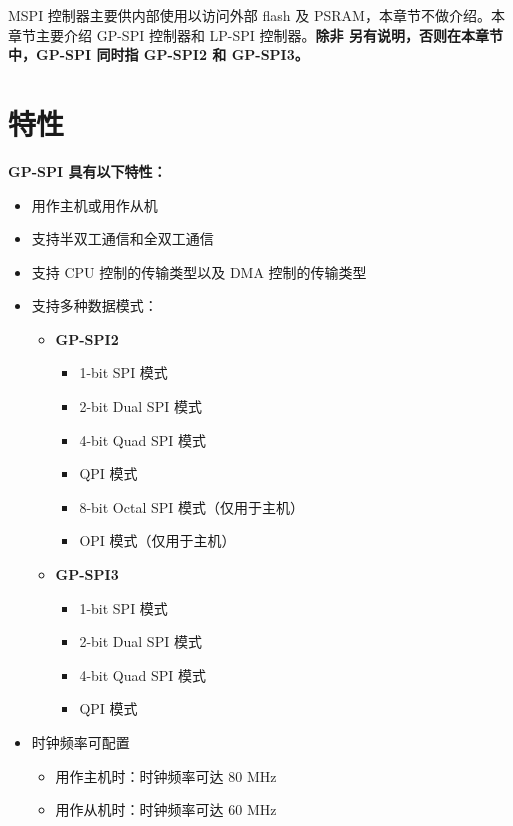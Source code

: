 \documentclass[main\_\_CN.tex]{subfiles}
\begin{document}
MSPI 控制器主要供内部使用以访问外部 flash 及 PSRAM，本章节不做介绍。本章节主要介绍 GP-SPI 控制器和 LP-SPI 控制器。\textbf{除非
另有说明，否则在本章节中，GP-SPI 同时指 GP-SPI2 和 GP-SPI3。}



\section{特性}

\textbf{GP-SPI 具有以下特性：}
\begin{itemize}
    \item 用作主机或用作从机
    \item 支持半双工通信和全双工通信
    \item 支持 CPU 控制的传输类型以及 DMA 控制的传输类型
    \item 支持多种数据模式：
        \begin{itemize}
            \item \textbf{GP-SPI2}
            \begin{itemize}
                \item 1-bit SPI 模式
                \item 2-bit Dual SPI 模式
                \item 4-bit Quad SPI 模式
                \item QPI 模式
                \item 8-bit Octal SPI 模式（仅用于主机）
                \item OPI 模式（仅用于主机）
        \end{itemize}
            \item \textbf{GP-SPI3}
            \begin{itemize}
                \item 1-bit SPI 模式
                \item 2-bit Dual SPI 模式
                \item 4-bit Quad SPI 模式
                \item QPI 模式
        \end{itemize}
        \end{itemize}
    \item 时钟频率可配置
        \begin{itemize}
            \item 用作主机时：时钟频率可达 80 MHz
            \item 用作从机时：时钟频率可达 60 MHz
        \end{itemize}

\end{itemize}
\end{document}
